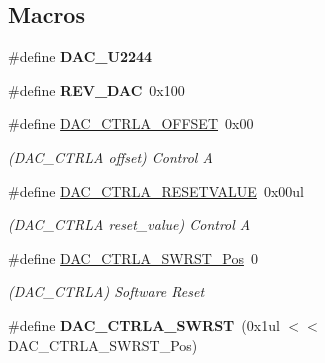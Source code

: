\subsection*{Macros}
\begin{DoxyCompactItemize}
\item 
\hypertarget{group___s_a_m_l21___d_a_c_ga015552a5dbc24bcc93dd894d0a3900c8}{}\#define {\bfseries D\+A\+C\+\_\+\+U2244}\label{group___s_a_m_l21___d_a_c_ga015552a5dbc24bcc93dd894d0a3900c8}

\item 
\hypertarget{group___s_a_m_l21___d_a_c_ga49409e81a9642d61cb82d3f664c44844}{}\#define {\bfseries R\+E\+V\+\_\+\+D\+A\+C}~0x100\label{group___s_a_m_l21___d_a_c_ga49409e81a9642d61cb82d3f664c44844}

\item 
\hypertarget{group___s_a_m_l21___d_a_c_gaebd4a25fcf855e7d3824acf7f9d3ac83}{}\#define \hyperlink{group___s_a_m_l21___d_a_c_gaebd4a25fcf855e7d3824acf7f9d3ac83}{D\+A\+C\+\_\+\+C\+T\+R\+L\+A\+\_\+\+O\+F\+F\+S\+E\+T}~0x00\label{group___s_a_m_l21___d_a_c_gaebd4a25fcf855e7d3824acf7f9d3ac83}

\begin{DoxyCompactList}\small\item\em (D\+A\+C\+\_\+\+C\+T\+R\+L\+A offset) Control A \end{DoxyCompactList}\item 
\hypertarget{group___s_a_m_l21___d_a_c_ga5b2a0ad82560fded073e6276046facfc}{}\#define \hyperlink{group___s_a_m_l21___d_a_c_ga5b2a0ad82560fded073e6276046facfc}{D\+A\+C\+\_\+\+C\+T\+R\+L\+A\+\_\+\+R\+E\+S\+E\+T\+V\+A\+L\+U\+E}~0x00ul\label{group___s_a_m_l21___d_a_c_ga5b2a0ad82560fded073e6276046facfc}

\begin{DoxyCompactList}\small\item\em (D\+A\+C\+\_\+\+C\+T\+R\+L\+A reset\+\_\+value) Control A \end{DoxyCompactList}\item 
\hypertarget{group___s_a_m_l21___d_a_c_gafa3f0f563ba0dcc229026ca6d3effdcc}{}\#define \hyperlink{group___s_a_m_l21___d_a_c_gafa3f0f563ba0dcc229026ca6d3effdcc}{D\+A\+C\+\_\+\+C\+T\+R\+L\+A\+\_\+\+S\+W\+R\+S\+T\+\_\+\+Pos}~0\label{group___s_a_m_l21___d_a_c_gafa3f0f563ba0dcc229026ca6d3effdcc}

\begin{DoxyCompactList}\small\item\em (D\+A\+C\+\_\+\+C\+T\+R\+L\+A) Software Reset \end{DoxyCompactList}\item 
\hypertarget{group___s_a_m_l21___d_a_c_gab50aae3a8aa2d5bcfb9892d87f425fd8}{}\#define {\bfseries D\+A\+C\+\_\+\+C\+T\+R\+L\+A\+\_\+\+S\+W\+R\+S\+T}~(0x1ul $<$$<$ D\+A\+C\+\_\+\+C\+T\+R\+L\+A\+\_\+\+S\+W\+R\+S\+T\+\_\+\+Pos)\label{group___s_a_m_l21___d_a_c_gab50aae3a8aa2d5bcfb9892d87f425fd8}


\end{DoxyCompactItemize}
